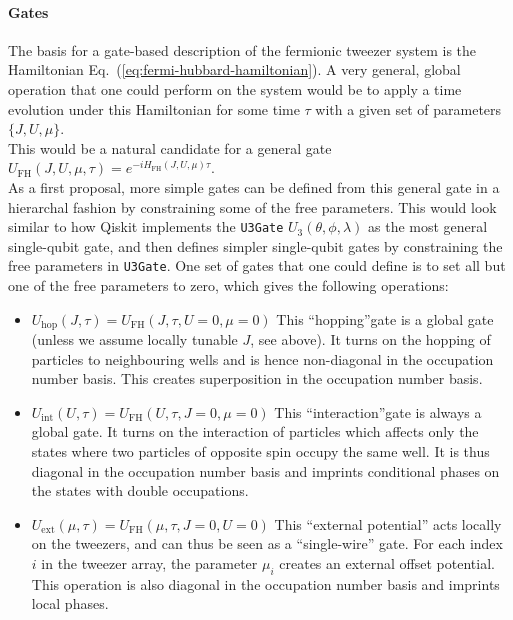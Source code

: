 \documentclass[a4paper, 10pt]{article}
\begin{document}
    \paragraph{Gates}
    The basis for a gate-based description of the fermionic tweezer system is the Hamiltonian Eq.~(\ref{eq:fermi-hubbard-hamiltonian}).
    A very general, global operation that one could perform on the system would be to apply a time evolution under this Hamiltonian for some time $\tau$ with a given set of parameters $\{J, U, \mu \}$. \\ This would be a natural candidate for a general gate $U_{\text{FH}}( J, U, \mu,  \tau ) = e^{  - i H_{\text{FH}}( J, U, \mu) \tau } $.\\
    
    \noindent As a first proposal, more simple gates can be defined from this general gate in a hierarchal fashion by constraining some of the free parameters.
    This would look similar to how Qiskit implements the \texttt{U3Gate} $U_3(\theta, \phi, \lambda)$ as the most general single-qubit gate, and then defines simpler single-qubit gates by constraining the free parameters in \texttt{U3Gate}.
    One set of gates that one could define is to set all but one of the free parameters to zero, which gives the following operations:
    
    \begin{itemize}
        \item $U_{\text{hop}}(J, \tau) = U_{\text{FH}}( J, \tau, U=0, \mu=0) $
        This ``hopping''gate is a global gate (unless we assume locally tunable $J$, see above). It turns on the hopping of particles to neighbouring wells and is hence non-diagonal in the occupation number basis. This creates superposition in the occupation number basis. 
        
        \item $U_{\text{int}}(U, \tau) = U_{\text{FH}}( U, \tau, J=0, \mu=0) $
        This ``interaction''gate is always a global gate. It turns on the interaction of particles which affects only the states where two particles of opposite spin occupy the same well.
        It is thus diagonal in the occupation number basis and imprints conditional phases on the states with double occupations.
        
        \item $U_{\text{ext}}(\mu, \tau) = U_{\text{FH}}( \mu, \tau, J=0, U=0) $
        This ``external potential'' acts locally on the tweezers, and can thus be seen as a ``single-wire'' gate.
        For each index $i$ in the tweezer array, the parameter $\mu_i$ creates an external offset potential.
        This operation is also diagonal in the occupation number basis and imprints local phases. 
    \end{itemize}
    
\end{document}
